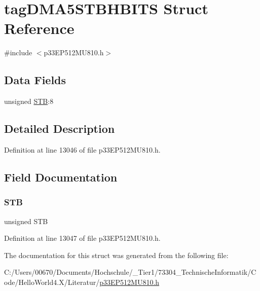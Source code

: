 \hypertarget{structtag_d_m_a5_s_t_b_h_b_i_t_s}{}\section{tag\+D\+M\+A5\+S\+T\+B\+H\+B\+I\+TS Struct Reference}
\label{structtag_d_m_a5_s_t_b_h_b_i_t_s}


{\ttfamily \#include $<$p33\+E\+P512\+M\+U810.\+h$>$}

\subsection*{Data Fields}
\begin{DoxyCompactItemize}
\item 
unsigned \hyperlink{structtag_d_m_a5_s_t_b_h_b_i_t_s_a9bd043a4db27e09b5035a563a8758fe7}{S\+TB}\+:8
\end{DoxyCompactItemize}


\subsection{Detailed Description}


Definition at line 13046 of file p33\+E\+P512\+M\+U810.\+h.



\subsection{Field Documentation}
\mbox{\label{structtag_d_m_a5_s_t_b_h_b_i_t_s_a9bd043a4db27e09b5035a563a8758fe7}} 
\subsubsection{\texorpdfstring{S\+TB}{STB}}
{\footnotesize\ttfamily unsigned S\+TB}



Definition at line 13047 of file p33\+E\+P512\+M\+U810.\+h.



The documentation for this struct was generated from the following file\+:\begin{DoxyCompactItemize}
\item 
C\+:/\+Users/00670/\+Documents/\+Hochschule/\+\_\+\+Tier1/73304\+\_\+\+Technische\+Informatik/\+Code/\+Hello\+World4.\+X/\+Literatur/\hyperlink{p33_e_p512_m_u810_8h}{p33\+E\+P512\+M\+U810.\+h}\end{DoxyCompactItemize}
